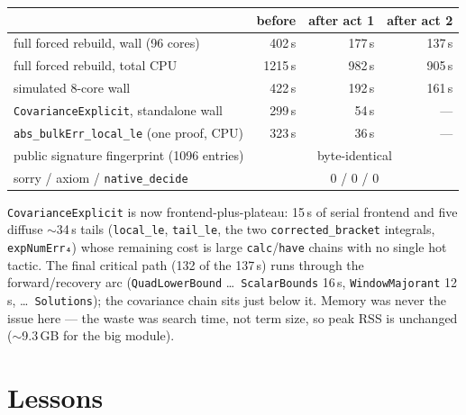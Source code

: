 \documentclass[11pt]{article}
\begin{document}
\begin{center}
\begin{tabular}{lrrr}
\toprule
 & before & after act 1 & after act 2 \\
\midrule
full forced rebuild, wall (96 cores) & 402\,s & 177\,s & 137\,s \\
full forced rebuild, total CPU & 1215\,s & 982\,s & 905\,s \\
simulated 8-core wall & 422\,s & 192\,s & 161\,s \\
\texttt{CovarianceExplicit}, standalone wall & 299\,s & 54\,s & --- \\
\texttt{abs\_bulkErr\_local\_le} (one proof, CPU) & 323\,s & 36\,s & --- \\
public signature fingerprint (1096 entries) & \multicolumn{3}{c}{byte-identical} \\
sorry / axiom / \texttt{native\_decide} & \multicolumn{3}{c}{0 / 0 / 0} \\
\bottomrule
\end{tabular}
\end{center}

\noindent \texttt{CovarianceExplicit} is now frontend-plus-plateau:
15\,s of serial frontend and five diffuse $\sim$34\,s tails
(\texttt{local\_le}, \texttt{tail\_le}, the two
\texttt{corrected\_bracket} integrals, \texttt{expNumErr₄}) whose
remaining cost is large \texttt{calc}/\texttt{have} chains with no
single hot tactic. The final critical path (132 of the 137\,s) runs
through the forward/recovery arc
(\texttt{QuadLowerBound} \dots\ \texttt{ScalarBounds} 16\,s,
\texttt{WindowMajorant} 12\,s, \dots\ \texttt{Solutions}); the
covariance chain sits just below it. Memory was never the issue here
--- the waste was search time, not term size, so peak RSS is unchanged
($\sim$9.3\,GB for the big module).

\section{Lessons}
\end{document}
